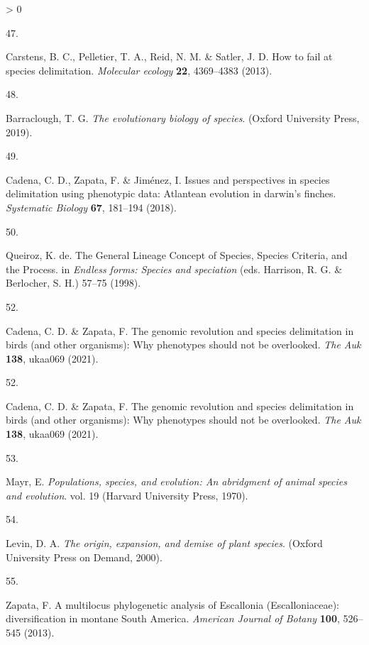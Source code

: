 \documentclass[
  11pt,
]{article}
\newlength{\cslhangindent}
\newlength{\csllabelwidth}
\newenvironment{CSLReferences}[2] %
 {%
  \setlength{\parindent}{0pt}
  \ifodd #1 \everypar{\setlength{\hangindent}{\cslhangindent}}\ignorespaces\fi
  \ifnum #2 > 0
  \setlength{\parskip}{#2\baselineskip}
  \fi
 }%
 {}
\newcommand{\CSLLeftMargin}[1]{\parbox[t]{\csllabelwidth}{#1}}
\newcommand{\CSLRightInline}[1]{\parbox[t]{\linewidth - \csllabelwidth}{#1}\break}
\begin{document}
\begin{CSLReferences}{0}{0}
\leavevmode\hypertarget{ref-carstens2013fail}{}%
\CSLLeftMargin{47. }
\CSLRightInline{Carstens, B. C., Pelletier, T. A., Reid, N. M. \& Satler, J. D. How to fail at species delimitation. \emph{Molecular ecology} \textbf{22}, 4369--4383 (2013).}

\leavevmode\hypertarget{ref-barraclough2019evolutionary}{}%
\CSLLeftMargin{48. }
\CSLRightInline{Barraclough, T. G. \emph{The evolutionary biology of species}. (Oxford University Press, 2019).}

\leavevmode\hypertarget{ref-cadena2018issues}{}%
\CSLLeftMargin{49. }
\CSLRightInline{Cadena, C. D., Zapata, F. \& Jiménez, I. Issues and perspectives in species delimitation using phenotypic data: Atlantean evolution in darwin's finches. \emph{Systematic Biology} \textbf{67}, 181--194 (2018).}

\leavevmode\hypertarget{ref-de1998general}{}%
\CSLLeftMargin{50. }
\CSLRightInline{Queiroz, K. de. {The General Lineage Concept of Species, Species Criteria, and the Process}. in \emph{Endless forms: Species and speciation} (eds. Harrison, R. G. \& Berlocher, S. H.) 57--75 (1998).}

\leavevmode\hypertarget{ref-cadena2021genomic}{}%
\CSLLeftMargin{52. }
\CSLRightInline{Cadena, C. D. \& Zapata, F. The genomic revolution and species delimitation in birds (and other organisms): Why phenotypes should not be overlooked. \emph{The Auk} \textbf{138}, ukaa069 (2021).}

\leavevmode\hypertarget{ref-cadena2021genomic}{}%
\CSLLeftMargin{52. }
\CSLRightInline{Cadena, C. D. \& Zapata, F. The genomic revolution and species delimitation in birds (and other organisms): Why phenotypes should not be overlooked. \emph{The Auk} \textbf{138}, ukaa069 (2021).}

\leavevmode\hypertarget{ref-mayr1970populations}{}%
\CSLLeftMargin{53. }
\CSLRightInline{Mayr, E. \emph{Populations, species, and evolution: An abridgment of animal species and evolution}. vol. 19 (Harvard University Press, 1970).}

\leavevmode\hypertarget{ref-levin2000origin}{}%
\CSLLeftMargin{54. }
\CSLRightInline{Levin, D. A. \emph{The origin, expansion, and demise of plant species}. (Oxford University Press on Demand, 2000).}

\leavevmode\hypertarget{ref-zapata2013multilocus}{}%
\CSLLeftMargin{55. }
\CSLRightInline{Zapata, F. {A multilocus phylogenetic analysis of Escallonia (Escalloniaceae): diversification in montane South America}. \emph{American Journal of Botany} \textbf{100}, 526--545 (2013).}


\end{CSLReferences}
\end{document}
